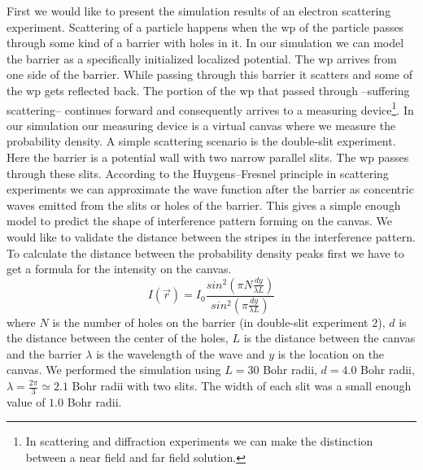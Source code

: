 First we would like to present the simulation results of an electron scattering experiment.
Scattering of a particle happens when the \acrshort{wp} of the particle passes through some kind of a barrier with holes in it.
In our simulation we can model the barrier as a specifically initialized localized potential.
The \acrshort{wp} arrives from one side of the barrier.
While passing through this barrier it scatters and some of the \acrshort{wp} gets reflected back.
The portion of the \acrshort{wp} that passed through --suffering scattering-- continues forward and consequently arrives to a measuring device\footnote{In scattering and diffraction experiments we can make the distinction between a near field and far field solution.}.
In our simulation our measuring device is a virtual canvas where we measure the probability density.
A simple scattering scenario is the double-slit experiment.
Here the barrier is a potential wall with two narrow parallel slits.
The \acrshort{wp} passes through these slits.
According to the Huygens–Fresnel principle in scattering experiments we can approximate the wave function after the barrier as concentric waves emitted from the slits or holes of the barrier.
This gives a simple enough model to predict the shape of interference pattern forming on the canvas.
We would like to validate the distance between the stripes in the interference pattern.
To calculate the distance between the probability density peaks first we have to get a formula for the intensity on the canvas.
\begin{equation}
	\label{eq:Huygens}
	I(\vec{r}) = I_0 \frac{sin^2\left( \pi N \frac{dy}{\lambda L} \right)}{sin^2\left( \pi \frac{dy}{\lambda L} \right)}
\end{equation}
where $N$ is the number of holes on the barrier (in double-slit experiment $2$), $d$ is the distance between the center of the holes, $L$ is the distance between the canvas and the barrier $\lambda$ is the wavelength of the wave and $y$ is the location on the canvas.
We performed the simulation using $L = 30$ Bohr radii, $d = 4.0$ Bohr radii, $\lambda = \frac{2\pi}{3}\simeq 2.1$ Bohr radii with two slits.
The width of each slit was a small enough value of $1.0$ Bohr radii.
